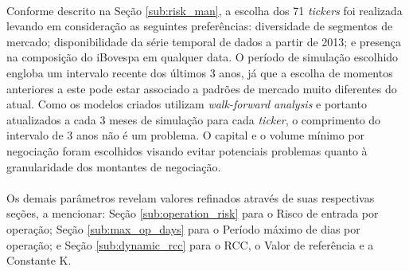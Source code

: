 
\paragraph{} Conforme descrito na Seção \ref{sub:risk_man}, a escolha dos 71 \textit{tickers} foi realizada levando em consideração as seguintes preferências: diversidade de segmentos de mercado; disponibilidade da série temporal de dados a partir de 2013; e presença na composição do iBovespa em qualquer data. O período de simulação escolhido engloba um intervalo recente dos últimos 3 anos, já que a escolha de momentos anteriores a este pode estar associado a padrões de mercado muito diferentes do atual. Como os modelos criados utilizam \textit{walk-forward analysis} e portanto atualizados a cada 3 meses de simulação para cada \textit{ticker}, o comprimento do intervalo de 3 anos não é um problema. O capital e o volume mínimo por negociação foram escolhidos visando evitar potenciais problemas quanto à granularidade dos montantes de negociação.

\paragraph{} Os demais parâmetros revelam valores refinados através de suas respectivas seções, a mencionar: Seção \ref{sub:operation_risk} para o Risco de entrada por operação; Seção \ref{sub:max_op_days} para o Período máximo de dias por operação; e Seção \ref{sub:dynamic_rcc} para o RCC, o Valor de referência e a Constante K.

